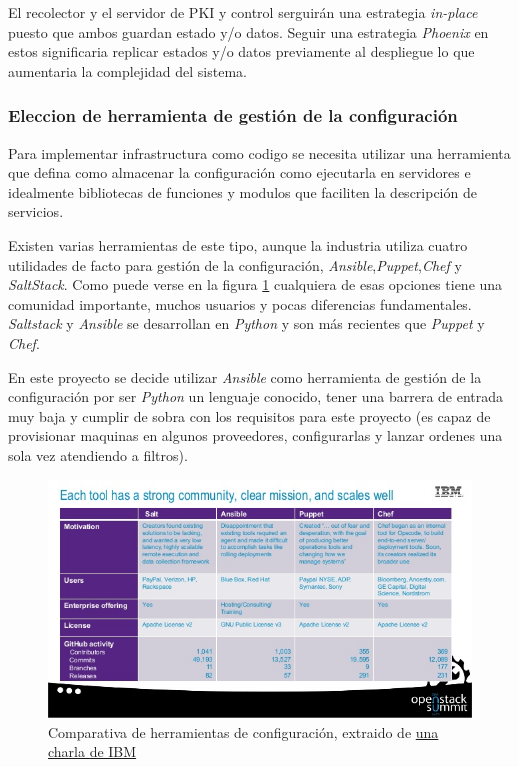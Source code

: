 El recolector y el servidor de PKI y control serguirán una estrategia \emph{in-place} puesto que ambos guardan estado y/o datos. Seguir una estrategia \emph{Phoenix} en estos
significaria replicar estados y/o datos previamente al despliegue lo que aumentaria la complejidad del sistema.

\subsubsection{Eleccion de herramienta de gestión de la configuración}

Para implementar infrastructura como codigo se necesita utilizar una herramienta que defina como almacenar la configuración
como ejecutarla en servidores e idealmente bibliotecas de funciones y modulos que faciliten la descripción de servicios.

Existen varias herramientas de este tipo, aunque la industria utiliza cuatro utilidades de facto para gestión de la configuración, \emph{Ansible},\emph{Puppet},\emph{Chef}
y  \emph{SaltStack}. Como puede verse en la figura \ref{fig:configmanagement1} cualquiera de esas opciones tiene una comunidad importante, muchos usuarios y pocas diferencias
fundamentales. \emph{Saltstack} y \emph{Ansible} se desarrollan en \emph{Python} y son más recientes que \emph{Puppet} y \emph{Chef}.

En este proyecto se decide utilizar \emph{Ansible} como herramienta de gestión de la configuración por ser \emph{Python} un lenguaje conocido, tener una barrera de entrada muy baja
y cumplir de sobra con los requisitos para este proyecto (es capaz de provisionar maquinas en algunos proveedores, configurarlas y lanzar ordenes una sola vez atendiendo a filtros).

\begin{figure}[h]
    \centering
      \includegraphics[scale=0.5]{images/configmanagement_tools1}
    \caption{Comparativa de herramientas de configuración, extraido de \href{https://www.slideshare.net/DanielKrook/caps-whats-best-for-deploying-and-managing-openstack-chef-vs-ansible-vs-puppet-vs-salt}{una charla de IBM}}
    \label{fig:configmanagement1}
  \end{figure}

